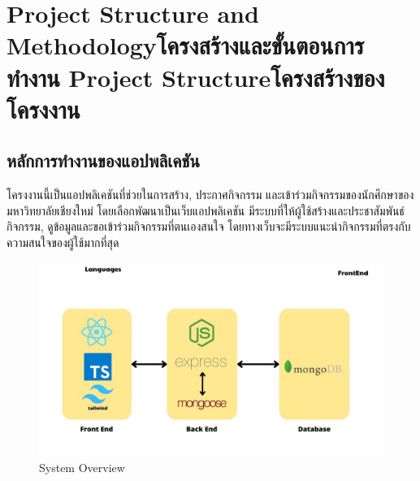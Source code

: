 \chapter{\ifproject%
\ifenglish Project Structure and Methodology\else โครงสร้างและขั้นตอนการทำงาน\fi
\else%
\ifenglish Project Structure\else โครงสร้างของโครงงาน\fi
\fi
}


\makeatletter


\makeatother



\section{หลักการทำงานของแอปพลิเคชัน}
โครงงานนี้เป็นแอปพลิเคชันที่ช่วยในการสร้าง, ประกาศกิจกรรม และเข้าร่วมกิจกรรมของนักศึกษาของมหาวิทยาลัยเชียงใหม่
โดยเลือกพัฒนาเป็นเว็บแอปพลิเคชัน มีระบบที่ให้ผู้ใช้สร้างและประชาสัมพันธ์กิจกรรม, ดูข้อมูลและขอเข้าร่วมกิจกรรมที่ตนเองสนใจ โดยทางเว็บจะมีระบบแนะนำกิจกรรมที่ตรงกับความสนใจของผู้ใช้มากที่สุด 
\begin{figure}[h] %
\begin{center}
\includegraphics[width=0.9\linewidth]{image/techFlow.jpg}
\end{center}
\caption[หลักการทำงานของแอปพลิเคชัน]{System Overview}
\label{fig:system_overview}
\end{figure}
